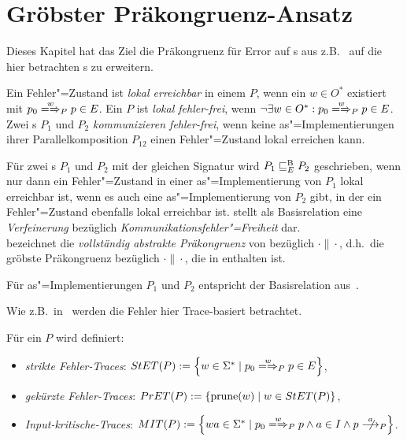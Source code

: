 \section{Gröbster Präkongruenz-Ansatz}

Dieses Kapitel hat das Ziel die Präkongruenz für Error auf \EIO{}s aus
z.B.~\cite{Schinko2016BA} auf die hier betrachten \MEIO{}s zu erweitern.

\begin{Def}
  Ein Fehler"=Zustand ist \emph{lokal erreichbar} in einem \MEIO{} $P$, wenn
  ein $w\in O^*$ existiert mit $p_0 \weakmay[w]_P p\in E$. Ein \MEIO{} $P$
  ist \emph{lokal fehler-frei}, wenn $\neg\exists w\in O^*: p_0\weakmay[w]_P
  p\in E$.\\
  Zwei \MEIO{}s $P_1$ und $P_2$ \emph{kommunizieren fehler-frei}, wenn keine
  as"=Implementierungen ihrer Parallelkomposition $P_{12}$ einen
  Fehler"=Zustand lokal erreichen kann.
\end{Def}

\vspace{0.2cm}

\begin{Def}
  \label{EBRelDef}
  Für zwei \MEIO{}s $P_1$ und $P_2$ mit der gleichen Signatur wird $P_1 \sqsubseteq  _E^\mathrm{B}{}
  P_2$ geschrieben, wenn nur dann ein Fehler"=Zustand in einer
  as"=Implementierung von $P_1$ lokal erreichbar ist, wenn es auch eine
  as"=Implementierung von $P_2$ gibt, in der ein Fehler"=Zustand ebenfalls
  lokal erreichbar ist. \EBRel{} stellt als Basisrelation eine
  \emph{Verfeinerung} bezüglich \emph{Kommunikationsfehler"=Freiheit} dar.\\
  \ECRel{} bezeichnet die \emph{vollständig abstrakte Präkongruenz} von
  \EBRel{} bezüglich $\cdot\|\cdot$, d.h.\ die gröbste Präkongruenz bezüglich
  $\cdot\|\cdot$, die in \EBRel{} enthalten ist.
\end{Def}

Für as"=Implementierungen $P_1$ und $P_2$ entspricht \EBRel{} der Basisrelation
\EBbaRel{} aus~\cite{Schinko2016BA}.

Wie z.B.\ in~\cite{Schinko2016BA} werden die Fehler hier Trace-basiert
betrachtet.

\begin{Def}
  \label{KommTracesDef}
  Für ein \MEIO{} $P$ wird definiert:
  \begin{itemize}
    \item \emph{strikte Fehler-Traces}: $\StET (P) :=
      \left\{w\in\Sigma ^* \mid p_0 \weakmay[w]_P p \in E\right\}$,
    \item \emph{gekürzte Fehler-Traces}: $PrET (P) :=
      \left\{\mathrm{prune} (w) \mid w\in StET (P)\right\}$,
    \item \emph{Input-kritische-Traces}: $\MIT (P) := \left\{wa\in\Sigma ^*
      \mid p_0 \weakmay[w]_P p \land a\in I\land p\nmust[a]_P \right\}$.
  \end{itemize}
\end{Def}

